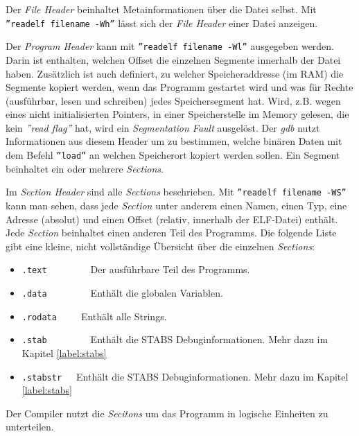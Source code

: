 


Der \textit{File Header} beinhaltet Metainformationen über die Datei selbst.
Mit \texttt{''readelf filename -Wh''} lässt sich der \textit{File Header} einer Datei anzeigen.

Der \textit{Program Header} kann mit \texttt{''readelf filename -Wl''} ausgegeben werden.
Darin ist enthalten, welchen Offset die einzelnen Segmente innerhalb der Datei haben.
Zusätzlich ist auch definiert, zu welcher Speicheraddresse (im RAM) die Segmente kopiert werden, wenn das Programm gestartet wird und was für Rechte (ausführbar, lesen und schreiben) jedes Speichersegment hat.
Wird, z.B. wegen eines nicht initialisierten Pointers, in einer Speicherstelle im Memory gelesen, die kein \textit{''read flag''} hat, wird ein \textit{Segmentation Fault} ausgelöst.
Der \textit{gdb} nutzt Informationen aus diesem Header um zu bestimmen, welche binären Daten mit dem Befehl \texttt{''load''} an welchen Speicherort kopiert werden sollen.
Ein Segment beinhaltet ein oder mehrere \textit{Sections}.

Im \textit{Section Header} sind alle \textit{Sections} beschrieben.
Mit \texttt{''readelf filename -WS''} kann man sehen, dass jede \textit{Section} unter anderem einen Namen, einen Typ, eine Adresse (absolut) und einen Offset (relativ, innerhalb der ELF-Datei) enthält.
Jede \textit{Section} beinhaltet einen anderen Teil des Programms.
Die folgende Liste gibt eine kleine, nicht vollständige Übersicht über die einzelnen \textit{Sections}:
\begin{itemize}
	\item \texttt{.text}\ \ \ \ \ \ \ \ \ Der ausführbare Teil des Programms.
	\item \texttt{.data}\ \ \ \ \ \ \ \ \ Enthält die globalen Variablen.
	\item \texttt{.rodata}\ \ \ \ \ Enthält alle Strings.
	\item \texttt{.stab}\ \ \ \ \ \ \ \ \ Enthält die STABS Debuginformationen. Mehr dazu im Kapitel \ref{label:stabs} 
	\item \texttt{.stabstr}\ \ \ Enthält die STABS Debuginformationen. Mehr dazu im Kapitel \ref{label:stabs} 
\end{itemize}
Der Compiler nutzt die \textit{Secitons} um das Programm in logische Einheiten zu unterteilen.


